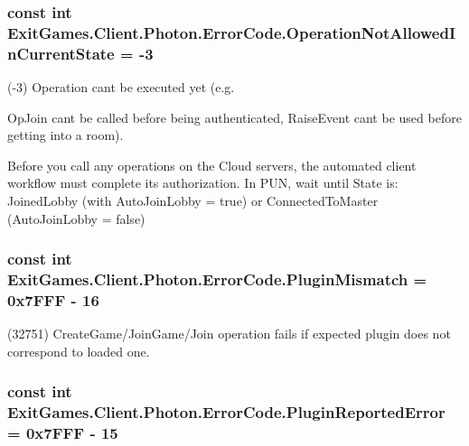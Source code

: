 \subsubsection[{\texorpdfstring{Operation\+Not\+Allowed\+In\+Current\+State}{OperationNotAllowedInCurrentState}}]{\setlength{\rightskip}{0pt plus 5cm}const int Exit\+Games.\+Client.\+Photon.\+Error\+Code.\+Operation\+Not\+Allowed\+In\+Current\+State = -\/3}\hypertarget{class_exit_games_1_1_client_1_1_photon_1_1_error_code_a7a4b13bd9524022d433f5d70e1ae944a}{}\label{class_exit_games_1_1_client_1_1_photon_1_1_error_code_a7a4b13bd9524022d433f5d70e1ae944a}


(-\/3) Operation can\textquotesingle{}t be executed yet (e.\+g. 

Op\+Join can\textquotesingle{}t be called before being authenticated, Raise\+Event cant be used before getting into a room). 

Before you call any operations on the Cloud servers, the automated client workflow must complete its authorization. In P\+UN, wait until State is\+: Joined\+Lobby (with Auto\+Join\+Lobby = true) or Connected\+To\+Master (Auto\+Join\+Lobby = false) 
\subsubsection[{\texorpdfstring{Plugin\+Mismatch}{PluginMismatch}}]{\setlength{\rightskip}{0pt plus 5cm}const int Exit\+Games.\+Client.\+Photon.\+Error\+Code.\+Plugin\+Mismatch = 0x7\+F\+F\+F -\/ 16}\hypertarget{class_exit_games_1_1_client_1_1_photon_1_1_error_code_a5dedf06ff727b7cd59d0850cc3afd5e9}{}\label{class_exit_games_1_1_client_1_1_photon_1_1_error_code_a5dedf06ff727b7cd59d0850cc3afd5e9}


(32751) Create\+Game/\+Join\+Game/\+Join operation fails if expected plugin does not correspond to loaded one. 

\subsubsection[{\texorpdfstring{Plugin\+Reported\+Error}{PluginReportedError}}]{\setlength{\rightskip}{0pt plus 5cm}const int Exit\+Games.\+Client.\+Photon.\+Error\+Code.\+Plugin\+Reported\+Error = 0x7\+F\+F\+F -\/ 15}\hypertarget{class_exit_games_1_1_client_1_1_photon_1_1_error_code_aae1b5ea63ffb0891abe77ebc4aca0e99}{}\label{class_exit_games_1_1_client_1_1_photon_1_1_error_code_aae1b5ea63ffb0891abe77ebc4aca0e99}


